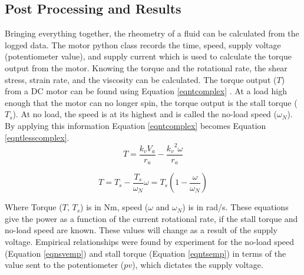 \documentclass[twoside,a4]{report}
\begin{document}
	\subsection*{Post Processing and Results} %
	Bringing everything together, the rheometry of a fluid can be calculated from the logged data. The motor python class records the time, speed, supply voltage (potentiometer value), and supply current which is used to calculate the torque output from the motor. Knowing the torque and the rotational rate, the shear stress, strain rate, and the viscosity can be calculated. The torque output (\(T\)) from a DC motor can be found using Equation \ref{eqntcomplex} \cite{backdcmotor}. At a load high enough that the motor can no longer spin, the torque output is the stall torque (\(T_s\)). At no load, the speed is at its highest and is called the no-load speed (\(\omega_N\)). By applying this information Equation \ref{eqntcomplex} becomes Equation \ref{eqntlesscomplex}.
	\begin{equation}
		T = \frac{k_v V_a}{r_a} - \frac{{{k_v}^2} \omega}{r_a}
		\label{eqntcomplex}
	\end{equation}
	
	
	\begin{equation}
		T = T_s - \frac{T_s}{\omega_N} \omega = T_s \left(1 - \frac{\omega}{\omega_N}\right)
		\label{eqntlesscomplex}
	\end{equation}
	
	
	\noindent
	Where Torque (\(T\), \(T_s\)) is in Nm, speed (\(\omega\) and \(\omega_N\)) is in rad/s. These equations give the power as a function of the current rotational rate, if the stall torque and no-load speed are known. These values will change as a result of the supply voltage. Empirical relationships were found by experiment for the no-load speed (Equation \ref{eqnsvemp}) and stall torque (Equation \ref{eqntsemp}) in terms of the value sent to the potentiometer (\(pv\)), which dictates the supply voltage.
	
	
\end{document}
